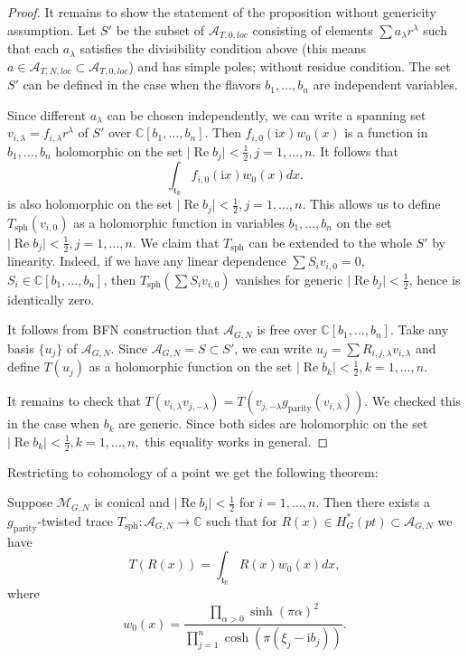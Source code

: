 \documentclass{article}
\newcommand{\R}{\mathbb{R}}
\renewcommand{\C}{\mathbb{C}}
\newcommand{\mf}{\mathfrak}
\newcommand{\mc}[1]{\mathcal{#1}}
\renewcommand{\Re}{\operatorname{Re}}
\newcommand{\abs}[1]{\lvert #1\rvert}
\newcommand{\rmi}{\mathrm{i}}
\DeclareMathOperator{\sph}{sph}
\begin{document}
\begin{proof}
  It remains to show the statement of the proposition without genericity assumption. Let $S'$ be the subset of $\mc{A}_{T,0,loc}$ consisting of elements $\sum a_{\lambda}r^{\lambda}$ such that each $a_{\lambda}$ satisfies the divisibility condition above (this means $a\in\mc{A}_{T,N,loc}\subset\mc{A}_{T,0,loc}$) and has simple poles; without residue condition. The set $S'$ can be defined in the case when the flavors $b_1,\ldots,b_n$ are independent variables.
  

 Since different $a_{\lambda}$ can be chosen independently, we can write a spanning set $v_{i,\lambda}=f_{i,\lambda}r^{\lambda}$ of $S'$ over $\C[b_1,\ldots,b_n]$. Then $f_{i,0}(\rmi x)w_0(x)$ is a function in $b_1,\ldots,b_n$ holomorphic on the set $\abs{\Re b_j}<\tfrac12, j=1,\ldots,n$. It follows that \[\int_{\mf{t}_{\R}} f_{i,0}(\rmi x)w_0(x)dx.\] is also holomorphic on the set $\abs{\Re b_j}<\tfrac12, j=1,\ldots,n$. This allows us to define $T_{\sph}(v_{i,0})$ as a holomorphic function in variables $b_1,\ldots,b_n$ on the set $\abs{\Re b_j}<\tfrac12, j=1,\ldots,n$. We claim that $T_{\sph}$ can be extended to the whole $S'$ by linearity. Indeed, if we have any linear dependence $\sum S_{i}v_{i,0}=0$, $S_i\in \C[b_1,\ldots,b_n]$, then $T_{\sph}(\sum S_i v_{i,0})$ vanishes for generic $\abs{\Re b_j}<\tfrac12$, hence is identically zero.

 
It follows from BFN construction that $\mc{A}_{G,N}$ is free over $\C[b_1,\ldots,b_n]$. Take any basis $\{u_j\}$ of $\mc{A}_{G,N}$. Since $\mc{A}_{G,N}=S\subset S'$, we can write $u_j=\sum R_{i,j,\lambda}v_{i,\lambda}$ and define $T(u_j)$ as a holomorphic function on the set $\abs{\Re b_k}<\tfrac12, k=1,\ldots,n$.

 
 It remains to check that $T(v_{i,\lambda}v_{j,-\lambda})=T(v_{j,-\lambda}g_{\text{parity}}(v_{i,\lambda}))$. We checked this in the case when $b_k$ are generic. Since both sides are holomorphic on the set $\abs{\Re b_k}<\tfrac12,k=1,\ldots,n,$ this equality works in general.
\end{proof}
Restricting to cohomology of a point we get the following theorem:
\begin{thr}
\label{ThrSphereTraceCohomology}
Suppose $\mc{M}_{G,N}$ is conical and $\abs{\Re b_i}<\tfrac12$ for $i=1,\ldots,n$. Then there exists a $g_{\text{parity}}$-twisted trace $T_{\sph}\colon \mc{A}_{G,N}\to \C$ such that for $R(x)\in H^*_G(pt)\subset \mc{A}_{G,N}$ we have
\[T(R(x))=\int_{\mf{t}_{\R}}R(x)w_0(x)dx,\] where \[w_0(x)=\frac{\prod_{\alpha>0} \sinh(\pi\alpha)^2}{\prod_{j=1}^n \cosh(\pi(\xi_j-\rmi b_j))}.\]
\end{thr}
\end{document}
